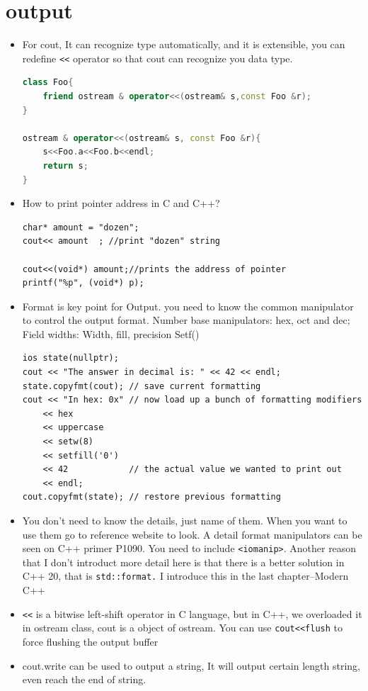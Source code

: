\documentclass[a4paper,11pt,twoside]{book}
\begin{document}
\section{output}

\begin{itemize}
	\item For cout, It can recognize type automatically, and it is extensible, you can redefine \verb=<<= operator so that cout can recognize you data type.
\begin{lstlisting}[frame=single, language=c++]
class Foo{
	friend ostream & operator<<(ostream& s,const Foo &r);
}
	
ostream & operator<<(ostream& s, const Foo &r){
	s<<Foo.a<<Foo.b<<endl;
    return s;
}
\end{lstlisting}
	
	\item  How to print pointer address in C and C++?
\begin{lstlisting}[numbers=none]
char* amount = "dozen";
cout<< amount  ; //print "dozen" string
	
cout<<(void*) amount;//prints the address of pointer
printf("%p", (void*) p);
\end{lstlisting}
	
	\item Format is key point for Output. you need to know the common manipulator to control the output format.  Number base manipulators:  hex, oct  and dec; Field widths: Width,  fill, precision Setf()
\begin{lstlisting}[]
ios state(nullptr);
cout << "The answer in decimal is: " << 42 << endl;
state.copyfmt(cout); // save current formatting
cout << "In hex: 0x" // now load up a bunch of formatting modifiers
    << hex
    << uppercase
    << setw(8)
    << setfill('0')
    << 42            // the actual value we wanted to print out
    << endl;
cout.copyfmt(state); // restore previous formatting
\end{lstlisting}

	\item You don't need to know the details, just name of them. When you want to use them go to reference website to look. A detail format manipulators can be seen on C++ primer P1090. You need to include \texttt{<iomanip>}. Another reason that I don't introduct more detail here is that there is a better solution in C++ 20, that is \texttt{std::format.}  I introduce this in the last chapter--Modern C++
	
	\item \verb=<<= is a bitwise left-shift operator in C language, but in C++, we overloaded it in ostream class, cout is a object of ostream.  You can use \verb=cout<<flush= to force flushing the output buffer

	\item cout.write can be used to output a string, It will output certain length string, even reach the end of string.
\end{itemize}
\end{document}
